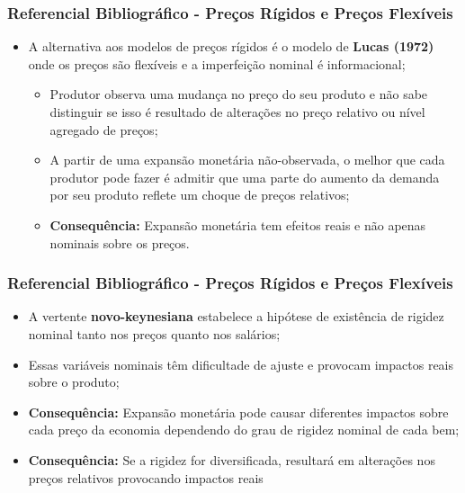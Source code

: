 \documentclass[aspectratio=169]{beamer}
\begin{document}
\begin{frame}\frametitle{Referencial Bibliográfico - Preços Rígidos e Preços Flexíveis}
  \begin{itemize}
  \item A alternativa aos modelos de preços rígidos é o modelo de \textbf{Lucas (1972)} onde os preços são flexíveis e a imperfeição nominal é informacional;
    \begin{itemize}
    \item Produtor observa uma mudança no preço do seu produto e não sabe distinguir se isso é resultado de alterações no preço relativo ou nível agregado de preços;
    \item A partir de uma expansão monetária não-observada, o melhor que cada produtor pode fazer é admitir que uma parte do aumento da demanda por seu produto reflete um choque de preços relativos;
    \item \textbf{Consequência:} Expansão monetária tem efeitos reais e não apenas nominais sobre os preços.
    \end{itemize}
  \end{itemize}
\end{frame}

\begin{frame}\frametitle{Referencial Bibliográfico - Preços Rígidos e Preços Flexíveis}
  \begin{itemize}
  \item A vertente \textbf{novo-keynesiana} estabelece a hipótese de existência de rigidez nominal tanto nos preços quanto nos salários;
  \item Essas variáveis nominais têm dificultade de ajuste e provocam impactos reais sobre o produto;
  \item \textbf{Consequência:} Expansão monetária pode causar diferentes impactos sobre cada preço da economia dependendo do grau de rigidez nominal de cada bem;
  \item \textbf{Consequência:} Se a rigidez for diversificada, resultará em alterações nos preços relativos provocando impactos reais
  \end{itemize}
\end{frame}
\end{document}
